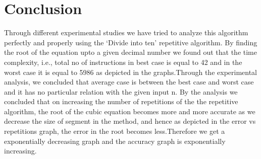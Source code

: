 \documentclass[conference]{IEEEtran}
\begin{document}
\section{\textbf{Conclusion}}
Through different experimental studies we have tried to analyze this algorithm perfectly and properly using the ‘Divide into ten’ repetitive algorithm. By finding the root of the equation upto a given decimal number we found out that the time complexity, i.e., total no of instructions in best case is equal to 42 and in the worst case it is equal to 5986 as depicted in the graphs.Through the experimental analysis, we concluded that average case is between the best case and worst case and it has no particular relation with the given input n.
By the analysis we concluded that on increasing the number of repetitions of the the repetitive algorithm, the root of the cubic equation becomes more and more accurate as we decrease the size of segment in the method, and hence as depicted in the error vs repetitions graph, the error in the root becomes less.Therefore we get a exponentially decreasing graph and the accuracy graph is exponentially increasing.
\end{document}
